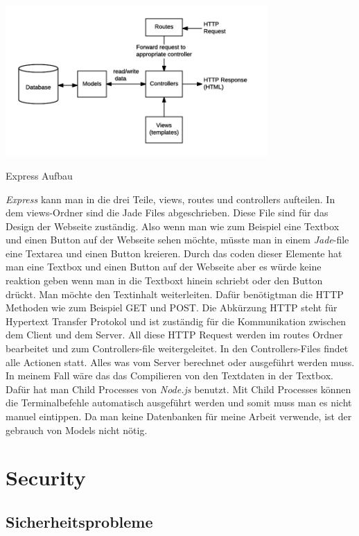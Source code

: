 \documentclass[10pt]{article}
\begin{document}
\begin{floatingfigure}[r]{11cm}
    \centering
    \includegraphics[width=10cm]{Bilder/MVCexpress.png}
    \caption{Express Aufbau \cite{5}}
    \label{fig:figlabel}
\end{floatingfigure}

\textit{Express} kann man in die drei Teile, views, routes und controllers aufteilen. In dem views-Ordner sind die Jade Files abgeschrieben. Diese File sind für das Design der Webseite zuständig. Also wenn man wie zum Beispiel eine Textbox und einen Button auf der Webseite sehen möchte, müsste man in einem \textit{Jade}-file eine Textarea und einen Button kreieren. Durch das coden dieser Elemente hat man eine Textbox und einen Button auf der Webseite aber es würde keine reaktion geben wenn man in die Textboxt hinein schriebt oder den Button drückt. Man möchte den Textinhalt weiterleiten. Dafür benötigtman die HTTP Methoden wie zum Beispiel GET und POST. Die Abkürzung HTTP steht für Hypertext Transfer Protokol und ist zuständig für die Kommunikation zwischen dem Client und dem Server.\cite{6} All diese HTTP Request werden im routes Ordner bearbeitet und zum Controllers-file weitergeleitet. In den Controllers-Files findet alle Actionen statt. Alles was vom Server berechnet oder ausgeführt werden muss. In meinem Fall wäre das das Compilieren von den Textdaten in der Textbox. Dafür hat man Child Processes  von \textit{Node.js} benutzt. Mit Child Processes können die Terminalbefehle automatisch ausgeführt werden und somit muss man es nicht manuel eintippen. Da man keine Datenbanken für meine Arbeit verwende, ist der gebrauch von Models nicht nötig. 

	
	\pagebreak
	\section{Security}
	\subsection{Sicherheitsprobleme}
\end{document}
